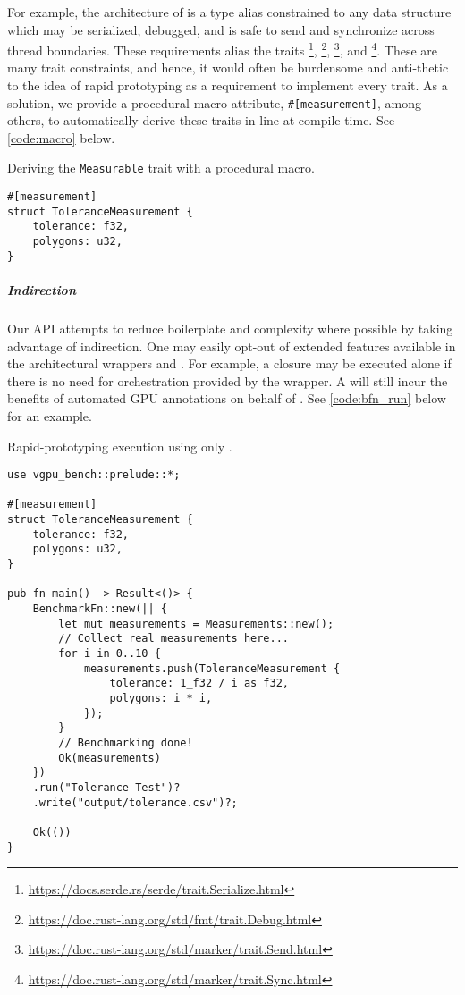 For example, the architecture of  is a type alias constrained to any data structure which may be serialized, debugged, and is safe to send and synchronize across thread boundaries. These requirements alias the traits \footnote{\href{https://docs.serde.rs/serde/trait.Serialize.html}{https://docs.serde.rs/serde/trait.Serialize.html}}, \footnote{\href{https://doc.rust-lang.org/std/fmt/trait.Debug.html}{https://doc.rust-lang.org/std/fmt/trait.Debug.html}}, \footnote{\href{https://doc.rust-lang.org/std/marker/trait.Send.html}{https://doc.rust-lang.org/std/marker/trait.Send.html}}, and \footnote{\href{https://doc.rust-lang.org/std/marker/trait.Sync.html}{https://doc.rust-lang.org/std/marker/trait.Sync.html}}. These are many trait constraints, and hence, it would often be burdensome and anti-thetic to the idea of rapid prototyping as a requirement to implement every trait. As a solution, we provide a procedural macro attribute, \texttt{#[measurement]}, among others, to automatically derive these traits in-line at compile time. See \cref{code:macro} below.\medskip

\begin{snippet}
\caption{Deriving the \texttt{Measurable} trait with a procedural macro.}\label{code:macro}
\begin{verbatim}
#[measurement]
struct ToleranceMeasurement {
    tolerance: f32,
    polygons: u32,
}
\end{verbatim}
\end{snippet}

\subparagraph{Indirection}
Our API attempts to reduce boilerplate and complexity where possible by taking advantage of indirection. One may easily opt-out of extended features available in the architectural wrappers  and . For example, a  closure may be executed alone if there is no need for  orchestration provided by the  wrapper. A  will still incur the benefits of automated GPU annotations on behalf of \toollinkedname. See \cref{code:bfn_run} below for an example.\medskip

\begin{snippet}
\caption{Rapid-prototyping execution using only .}\label{code:bfn_run}
\begin{verbatim}
use vgpu_bench::prelude::*;

#[measurement]
struct ToleranceMeasurement {
    tolerance: f32,
    polygons: u32,
}

pub fn main() -> Result<()> {
    BenchmarkFn::new(|| {
        let mut measurements = Measurements::new();
        // Collect real measurements here...
        for i in 0..10 {
            measurements.push(ToleranceMeasurement {
                tolerance: 1_f32 / i as f32,
                polygons: i * i,
            });
        }
        // Benchmarking done!
        Ok(measurements)
    })
    .run("Tolerance Test")?
    .write("output/tolerance.csv")?;

    Ok(())
}
\end{verbatim}
\end{snippet}

